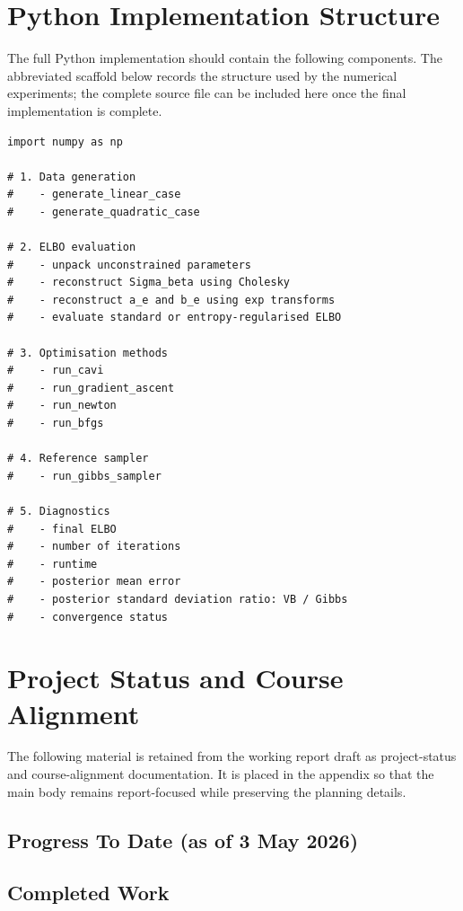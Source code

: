 \documentclass[11pt,a4paper]{article}
\begin{document}
\bigskip


\section{Python Implementation Structure}
\label{app:python-code}

The full Python implementation should contain the following components. The abbreviated scaffold below records the structure used by the numerical experiments; the complete source file can be included here once the final implementation is complete.

\begin{verbatim}
import numpy as np

# 1. Data generation
#    - generate_linear_case
#    - generate_quadratic_case

# 2. ELBO evaluation
#    - unpack unconstrained parameters
#    - reconstruct Sigma_beta using Cholesky
#    - reconstruct a_e and b_e using exp transforms
#    - evaluate standard or entropy-regularised ELBO

# 3. Optimisation methods
#    - run_cavi
#    - run_gradient_ascent
#    - run_newton
#    - run_bfgs

# 4. Reference sampler
#    - run_gibbs_sampler

# 5. Diagnostics
#    - final ELBO
#    - number of iterations
#    - runtime
#    - posterior mean error
#    - posterior standard deviation ratio: VB / Gibbs
#    - convergence status
\end{verbatim}
\section{Project Status and Course Alignment}

The following material is retained from the working report draft as project-status and course-alignment documentation. It is placed in the appendix so that the main body remains report-focused while preserving the planning details.

\subsection*{Progress To Date (as of 3 May 2026)}

\subsection*{Completed Work}
\end{document}
